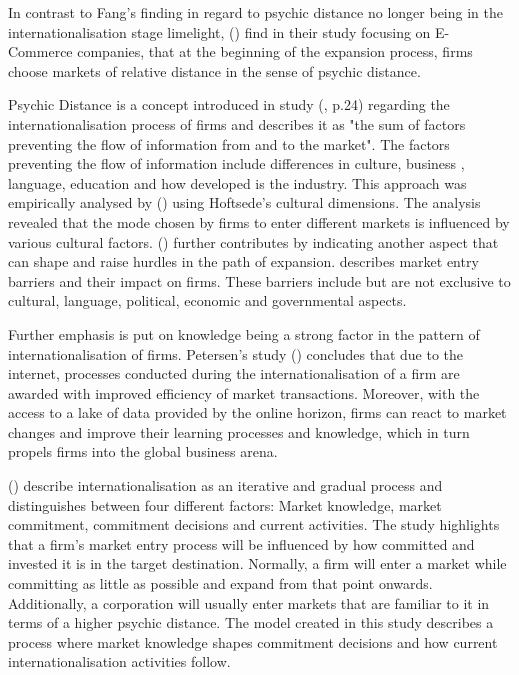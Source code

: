 \documentclass[12pt,a4paper]{article}
\begin{document}
In contrast to Fang's finding in regard to psychic distance no longer being in the internationalisation stage limelight, \citeauthor{forsgrenIgnorantImpatientInternationalization2007} (\citeyear{forsgrenIgnorantImpatientInternationalization2007})  find in their study focusing on E-Commerce companies, that at the beginning of the expansion process, firms choose markets of relative distance in the sense of psychic distance. \par
Psychic Distance is a concept introduced in \citeauthor{johansonInternationalizationProcessFirm1977}  study (\citeyear{johansonInternationalizationProcessFirm1977}, p.24) regarding the internationalisation process of firms and describes it as "the sum of factors preventing the flow of information from and to the market". The factors preventing the flow of information include differences in culture, business , language, education and how developed is the industry.  This approach was empirically analysed by \citeauthor{kogutEffectNationalCulture1988} (\citeyear{kogutEffectNationalCulture1988}) using Hoftsede's cultural dimensions. The analysis revealed that the mode chosen by firms to enter different markets is influenced by various cultural factors. 
\citeauthor{karakayaBarriersEntryInternational1993} (\citeyear{karakayaBarriersEntryInternational1993}) further contributes  by indicating another aspect that can shape and raise hurdles in the path of expansion. \citeauthor{karakayaBarriersEntryInternational1993} describes market entry barriers and their impact on firms. These barriers include but are not exclusive to cultural, language, political, economic and governmental aspects. \par
Further emphasis is put on knowledge being a strong factor in the pattern of internationalisation of firms. Petersen's study (\citeyear{petersenInternetForeignMarket2002}) concludes that due to the internet, processes conducted during the internationalisation of a firm are awarded with improved efficiency of market transactions. Moreover, with the access to a lake of data provided by the online horizon, firms can react to market changes and improve their learning processes and knowledge, which in turn propels firms into the global business arena. \par 
\citeauthor{johansonInternationalizationProcessFirm1977} (\citeyear{johansonInternationalizationProcessFirm1977}) describe internationalisation as an iterative and gradual process and distinguishes between four different factors: Market knowledge, market commitment, commitment decisions and current activities. The study highlights that a firm's market entry process will be influenced by how committed and invested it is in the target destination. Normally, a firm will enter a market while committing as little as possible and expand from that point onwards. Additionally, a corporation will usually enter markets that are familiar to it in terms of a higher psychic distance. The model created in this study describes a process where market knowledge shapes commitment decisions and how current internationalisation activities follow.  \par
\end{document}

